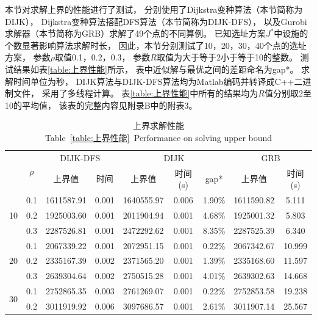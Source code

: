 本节对求解上界的性能进行了测试，
分别使用了Dijkstra变种算法（本节简称为DIJK），
Dijkstra变种算法搭配DFS算法（本节简称为DIJK-DFS），
以及Gurobi求解器（本节简称为GRB）求解了49个点的不同算例。
已知选址方案$J^*$中设施的个数显著影响算法求解时长，
因此，本节分别测试了10，20，30，40个点的选址方案，
参数$\rho$取值0.1，0.2，0.3，
参数$R$取值为大于等于2小于等于10的整数。
测试结果如表\ref{table:上界性能}所示，
表中近似解与最优之间的差距命名为gap*。
求解时间单位为秒，
DIJK算法与DIJK-DFS算法均为Matlab编码并转译成C++二进制文件，
采用了多线程计算。
表\ref{table:上界性能}中所有的结果均为$R$值分别取2至10的平均值，
该表的完整内容见附录B中的附表3。
 

\begin{table}[hbt]
	\small
	\setlength{\abovecaptionskip}{-0.05cm} %
	\setlength{\belowcaptionskip}{-0.2cm} 
	\centering
	\renewcommand\arraystretch{1}
	\caption{上界求解性能\\Table~\ref{table:上界性能}~Performance on solving upper bound}
		\begin{tabular}{crccccccc}
			\toprule
			\multirow{2}[1]{*}{\makecell[c]{$|J^*|$}} & \multicolumn{1}{c}{\multirow{2}[1]{*}{$\rho$}} & \multicolumn{2}{c}{DIJK-DFS} & \multicolumn{3}{c}{DIJK} & \multicolumn{2}{c}{GRB} \\
			\cmidrule(r){3-4} \cmidrule(r){5-7} \cmidrule(r){8-9}
			&       & 上界值   & 时间    & 上界值   & 时间(s) & gap*  & 上界值   & 时间(s) \\
			\midrule %
			\multirow{3}[0]{*}{10} 	& 0.1   & 1611587.91 & 0.001 & 1640555.97 & 0.006 & 1.90\% & 1611590.82 & 5.111 \\
									& 0.2   & 1925003.60 & 0.001 & 2011904.94 & 0.001 & 4.68\% & 1925001.32 & 5.803 \\
									& 0.3   & 2287526.81 & 0.001 & 2472292.62 & 0.001 & 8.35\% & 2287525.39 & 6.340 \\
	 		\multirow{3}[0]{*}{20} 	& 0.1   & 2067339.22 & 0.001 & 2072951.15 & 0.001 & 0.22\% & 2067342.67 & 10.999 \\
									& 0.2   & 2335167.39 & 0.002 & 2371565.20 & 0.001 & 1.39\% & 2335168.60 & 11.597 \\
									& 0.3   & 2639304.64 & 0.002 & 2750515.28 & 0.001 & 4.01\% & 2639302.63 & 14.668 \\
	  		\multirow{3}[0]{*}{30} 	& 0.1   & 2752865.35 & 0.003 & 2761269.07 & 0.001 & 0.22\% & 2752853.58 & 19.238 \\
									& 0.2   & 3011919.92 & 0.006 & 3097686.57 & 0.001 & 2.61\% & 3011907.14 & 25.567 \\

\end{tabular}
\end{table}
